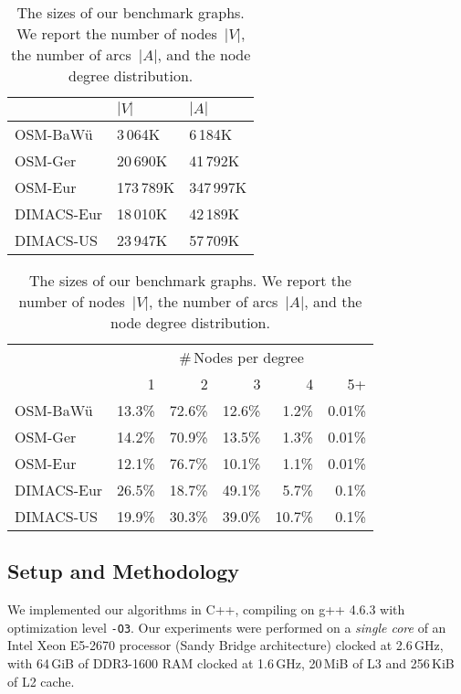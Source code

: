 \documentclass{sig-alternate}
\begin{document}
\begin{table}[b]
\caption{\label{tab:size}The sizes of our benchmark graphs. We report the number of nodes~$|V|$, the number of arcs~$|A|$, and the node degree distribution.}

\begin{tabular}{m{}m{}m{}}
\toprule
& $|V|$ & $|A|$ \tabularnewline
\midrule
OSM-BaWü & 3\,064K & 6\,184K \tabularnewline
OSM-Ger & 20\,690K & 41\,792K \tabularnewline
OSM-Eur & 173\,789K & 347\,997K \tabularnewline
DIMACS-Eur & 18\,010K & 42\,189K \tabularnewline
DIMACS-US & 23\,947K & 57\,709K \tabularnewline
\end{tabular}

\begin{tabular}{lrrrrr}
\toprule
 & \multicolumn{5}{c}{\#\,Nodes per degree}\tabularnewline
 & 1 & 2 & 3 & 4 & 5+\tabularnewline
\midrule
OSM-BaWü & 13.3\% & 72.6\% & 12.6\% & 1.2\% & 0.01\%\tabularnewline
OSM-Ger & 14.2\% & 70.9\% & 13.5\% & 1.3\% & 0.01\%\tabularnewline
OSM-Eur & 12.1\% & 76.7\% & 10.1\% & 1.1\% & 0.01\%\tabularnewline
DIMACS-Eur & 26.5\% & 18.7\% & 49.1\% & 5.7\% & 0.1\%\tabularnewline
DIMACS-US & 19.9\% & 30.3\% & 39.0\% & 10.7\% & 0.1\%\tabularnewline
\bottomrule
\end{tabular}

\end{table}

\subsection{Setup and Methodology}
We implemented our algorithms in C++, compiling on g++ 4.6.3 with optimization level \texttt{-O3}.
Our experiments were performed on a \emph{single core} of an Intel Xeon E5-2670 processor (Sandy Bridge architecture) clocked at 2.6\,GHz, with 64\,GiB of DDR3-1600 RAM clocked at 1.6\,GHz, 20\,MiB of L3 and 256\,KiB of L2 cache.
\end{document}
